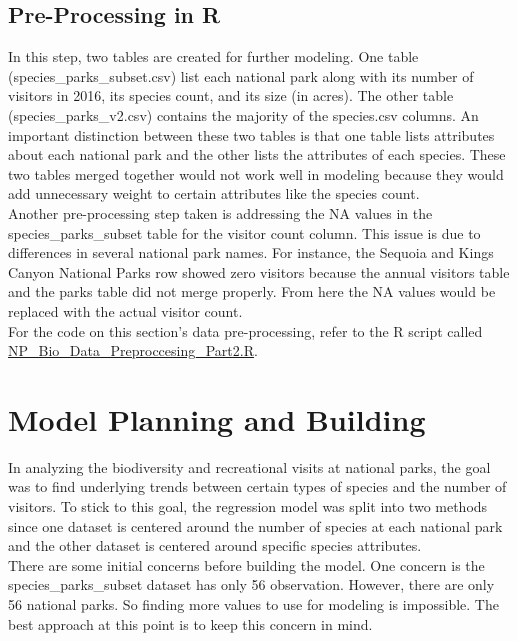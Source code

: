 \documentclass[stu, floatsintext, 11pt]{apa7}
\begin{document}
\subsection{Pre-Processing in R}
In this step, two tables are created for further modeling. One table (species\_parks\_subset.csv) list each national park along with its number of visitors in 2016, its species count, and its size (in acres). The other table (species\_parks\_v2.csv) contains the majority of the species.csv columns. An important distinction between these two tables is that one table lists attributes about each national park and the other lists the attributes of each species. These two tables merged together would not work well in modeling because they would add unnecessary weight to certain attributes like the species count. \\

Another pre-processing step taken is addressing the NA values in the species\_parks\_subset table for the visitor count column. This issue is due to differences in several national park names. For instance, the Sequoia and Kings Canyon National Parks row showed zero visitors because the annual visitors table and the parks table did not merge properly. From here the NA values would be replaced with the actual visitor count. \\

For the code on this section's data pre-processing, refer to the R script called \href{https://github.com/ohkaaaaay/NP_Biodiversity/blob/main/NP_Bio_Data_Preproccesing_Part2.R}{NP\_Bio\_Data\_Preproccesing\_Part2.R}.

\section{Model Planning and Building}
In analyzing the biodiversity and recreational visits at national parks, the goal was to find underlying trends between certain types of species and the number of visitors. To stick to this goal, the regression model was split into two methods since one dataset is centered around the number of species at each national park and the other dataset is centered around specific species attributes. \\

There are some initial concerns before building the model. One concern is the species\_parks\_subset dataset has only 56 observation. However, there are only 56 national parks. So finding more values to use for modeling is impossible. The best approach at this point is to keep this concern in mind. \\
\end{document}

